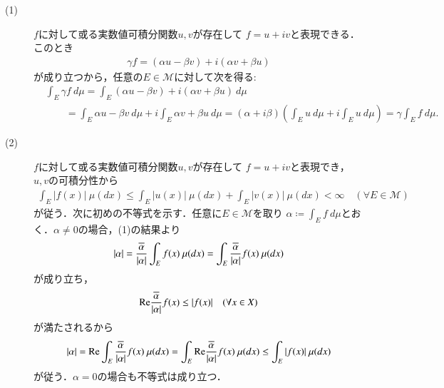 	\begin{prf}\mbox{}
		\begin{description}
			\item[(1)] $f$に対して或る実数値可積分関数$u,v$が存在して
				$f = u + i v$と表現できる．このとき
				\begin{align}
					\gamma f = (\alpha u - \beta v) + i (\alpha v + \beta u)
				\end{align}
				が成り立つから，任意の$E \in \mathcal{M}$に対して次を得る:
				\begin{align}
					&\int_E \gamma f\ d\mu
					= \int_E (\alpha u - \beta v) + i (\alpha v + \beta u)\ d \mu \\
					&\qquad = \int_E \alpha u - \beta v\ d\mu
						+ i \int_E \alpha v + \beta u\ d\mu
					= \left( \alpha + i \beta \right) 
						\left( \int_E u\ d\mu + i \int_E u\ d\mu \right)
					= \gamma \int_E f\ d\mu.
				\end{align}
			
			\item[(2)] 
				$f$に対して或る実数値可積分関数$u,v$が存在して
				$f = u + i v$と表現でき，$u,v$の可積分性から
				\begin{align}
					\int_E |f(x)|\ \mu(dx)
					\leq \int_E |u(x)|\ \mu(dx) + \int_E |v(x)|\ \mu(dx) < \infty
					\quad (\forall E \in \mathcal{M})
				\end{align}
				が従う．次に初めの不等式を示す．任意に$E \in \mathcal{M}$を取り
				$\alpha \coloneqq \int_E f\ d\mu$とおく．$\alpha \neq 0$の場合，(1)の結果より
				\begin{align}
					|\alpha|
					= \frac{\conj{\alpha}}{|\alpha|} \int_E f(x)\ \mu(dx)
					= \int_E \frac{\conj{\alpha}}{|\alpha|} f(x)\ \mu(dx)
				\end{align}
				が成り立ち，
				\begin{align}
					\mathrm{Re} \frac{\overline{\alpha}}{|\alpha|} f(x) \leq |f(x)|
					\quad (\forall x \in X)
				\end{align}
				が満たされるから
				\begin{align}
					|\alpha|
					= \Re{\int_E \frac{\conj{\alpha}}{|\alpha|} f(x)\ \mu(dx)}
					= \int_E \Re{\frac{\conj{\alpha}}{|\alpha|} f(x)}\ \mu(dx)
					\leq \int_E |f(x)|\ \mu(dx)
				\end{align}
				が従う．$\alpha = 0$の場合も不等式は成り立つ．
				

\end{description}
\end{prf}
